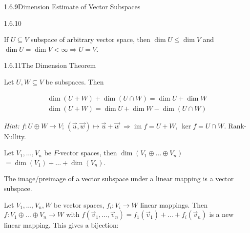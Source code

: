 \documentclass[10pt]{article} %
\renewcommand{\leq}{\leqslant}
\DeclareMathOperator{\im}{im}
\newcommand{\Hint}{\vspace{0.2em}\textit{Hint: }}
\begin{document}
\begin{multicols}{3}
\begin{corollary}{1.6.9}{Dimension Estimate of Vector Subspaces}
\end{corollary}

\begin{remark}{1.6.10}{}

    If $U \subseteq V$ subspace of arbitrary vector space, then $\dim{U} \leq \dim{V}$ and $\dim{U} = \dim{V} < \infty \Rightarrow U = V$.

\end{remark}

\begin{theorem}{1.6.11}{The Dimension Theorem}

    Let $U,W \subseteq V$ be subspaces. Then

        \begin{align*}
            \dim{(U + W)} + \dim{(U \cap W)} = \dim{U} + \dim{W} \\
            \dim{(U + W)} = \dim{U} + \dim{W} - \dim{(U \cap W)}
        \end{align*}

    \Hint $f: U \oplus W \to V$; $(\vec{u},\vec{w}) \mapsto \vec{u} + \vec{w}$ $\Rightarrow \im{f} = U + W$, $\ker{f} = U \cap W$. Rank-Nullity.

\end{theorem}

\begin{exercise}{6}{}

    Let $V_1,\hdots,V_n$ be $F$-vector spaces, then $\dim(V_1 \oplus \hdots \oplus V_n)$ $= \dim(V_1) + \hdots + \dim(V_n)$.

\end{exercise}

\begin{exercise}{10}{}

    The image/preimage of a vector subspace under a linear mapping is a vector subspace.

\end{exercise}

\begin{exercise}{12}{}

    Let $V_1,\hdots,V_n,W$ be vector spaces, $f_i:V_i \to W$ linear mappings. Then $f: V_1 \oplus \hdots \oplus V_n \to W$ with $f(\vec{v}_1,\hdots,\vec{v}_n) = f_1(\vec{v}_1) + \hdots + f_i(\vec{v}_n)$ is a new linear mapping. This gives a bijection:


\end{exercise}
\end{multicols}
\end{document}
